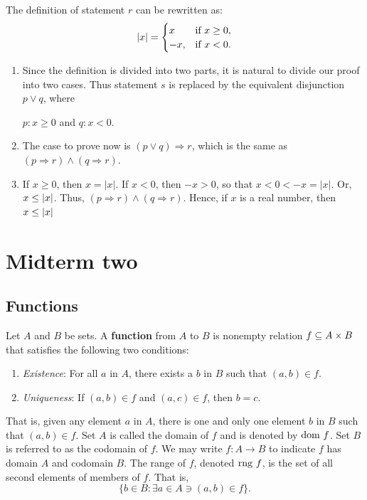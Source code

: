 \documentclass[12pt]{article}
\begin{document}
\begin{itemize}
The definition of statement \(r\) can be rewritten as:
\[\lvert{}x\rvert{}= 
  \begin{cases} 
    x & $if $x\ge{}0,  \\
    -x, & $if $x<0.
  \end{cases} \]

\begin{enumerate}
\item Since the definition is divided into two parts, it is natural to divide our
proof into two cases. Thus statement \(s\) is replaced by the equivalent
disjunction \(p\lor{}q\), where
\begin{center}
\(p: x\ge0\) and \(q: x<0\).
\end{center}

\item The case to prove now is \((p\lor{}q)\Rightarrow{}r\), which is the same as \((p\Rightarrow{}r)\land(q\Rightarrow{}r)\).

\item If \(x\ge0\), then \(x=\lvert{}x\rvert{}\). If \(x<0\), then \(-x>0\), so that
\(x<0<-x=\lvert{}x\rvert{}\). Or, \(x\le\left|x\right|\). Thus, \((p\Rightarrow{}r)\land(q\Rightarrow{}r)\). Hence, if
\(x\) is a real number, then \(x\le\left|x\right|\)
\end{enumerate}
\end{itemize}

\section{Midterm two}
\label{sec:org27a26db}
\subsection{Functions}
\label{sec:org1e1654e}
\begin{definition}[Function]
  Let $A$ and $B$ be sets. A \textbf{function} from $A$ to $B$ is nonempty relation
  $f \subseteq A \times B$ that satisfies the following two conditions:
  \begin{enumerate}
  \item \textit{Existence}: For all $a$ in $A$, there exists a $b$ in $B$ such
    that $(a, b) \in f$.
  \item \textit{Uniqueness}: If $(a,b) \in f$ and $(a, c) \in f$, then $b = c$.
  \end{enumerate}

  That is, given any element $a$ in $A$, there is one and only one element $b$
  in $B$ such  that $(a, b) \in f$. Set  $A$ is called the domain of  $f$ and is
  denoted by $\text{dom }f$.  Set $B$ is referred to as the codomain  of $f$. We may
  write $f : A \rightarrow B$ to indicate $f$ has domain $A$ and codomain $B$. The range
  of $f$, denoted  $\text{rng }f$, is the  set of all second elements  of members of
  $f$. That is, $$\{ b \in B : \exists a \in A \ni (a,b) \in f \}.$$
\end{definition}
\end{document}
